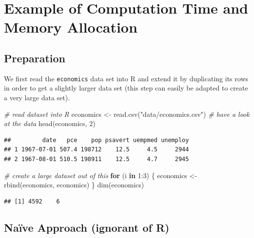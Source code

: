 \documentclass[
  12pt,
]{style/krantz}
\newenvironment{Shaded}{\begin{snugshade}}{\end{snugshade}}
\newcommand{\CommentTok}[1]{\textcolor[rgb]{0.56,0.35,0.01}{\textit{#1}}}
\newcommand{\ControlFlowTok}[1]{\textcolor[rgb]{0.13,0.29,0.53}{\textbf{#1}}}
\newcommand{\DecValTok}[1]{\textcolor[rgb]{0.00,0.00,0.81}{#1}}
\newcommand{\FunctionTok}[1]{\textcolor[rgb]{0.00,0.00,0.00}{#1}}
\newcommand{\NormalTok}[1]{#1}
\newcommand{\OtherTok}[1]{\textcolor[rgb]{0.56,0.35,0.01}{#1}}
\newcommand{\SpecialCharTok}[1]{\textcolor[rgb]{0.00,0.00,0.00}{#1}}
\newcommand{\StringTok}[1]{\textcolor[rgb]{0.31,0.60,0.02}{#1}}
\begin{document}
\hypertarget{example-of-computation-time-and-memory-allocation}{%
\section{Example of Computation Time and Memory Allocation}\label{example-of-computation-time-and-memory-allocation}}

\hypertarget{preparation}{%
\subsection{Preparation}\label{preparation}}

We first read the \texttt{economics} data set into R and extend it by duplicating its rows in order to get a slightly larger data set (this step can easily be adapted to create a very large data set).

\begin{Shaded}
\begin{Highlighting}[]
\CommentTok{\# read dataset into R}
\NormalTok{economics }\OtherTok{\textless{}{-}} \FunctionTok{read.csv}\NormalTok{(}\StringTok{"data/economics.csv"}\NormalTok{)}
\CommentTok{\# have a look at the data}
\FunctionTok{head}\NormalTok{(economics, }\DecValTok{2}\NormalTok{)}
\end{Highlighting}
\end{Shaded}

\begin{verbatim}
##         date   pce    pop psavert uempmed unemploy
## 1 1967-07-01 507.4 198712    12.5     4.5     2944
## 2 1967-08-01 510.5 198911    12.5     4.7     2945
\end{verbatim}

\begin{Shaded}
\begin{Highlighting}[]
\CommentTok{\# create a \textquotesingle{}large\textquotesingle{} dataset out of this}
\ControlFlowTok{for}\NormalTok{ (i }\ControlFlowTok{in} \DecValTok{1}\SpecialCharTok{:}\DecValTok{3}\NormalTok{) \{}
\NormalTok{     economics }\OtherTok{\textless{}{-}} \FunctionTok{rbind}\NormalTok{(economics, economics)}
\NormalTok{\}}
\FunctionTok{dim}\NormalTok{(economics)}
\end{Highlighting}
\end{Shaded}

\begin{verbatim}
## [1] 4592    6
\end{verbatim}

\hypertarget{nauxefve-approach-ignorant-of-r}{%
\subsection{Naïve Approach (ignorant of R)}\label{nauxefve-approach-ignorant-of-r}}
\end{document}
